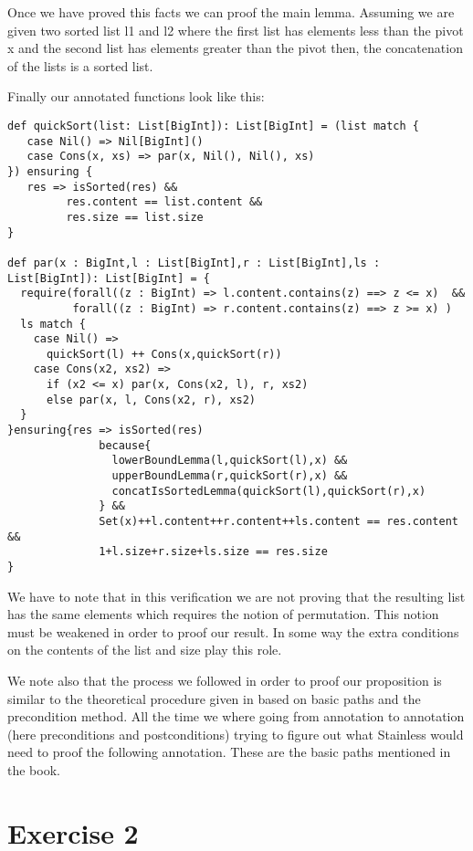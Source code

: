 \documentclass[a4paper,11pt]{article}
\theoremstyle{mytheor}
\begin{document}
Once we have proved this facts we can proof the main lemma. Assuming we are given two sorted list l1 and l2 where the first list has elements less than the pivot x and the second list has elements greater than the pivot then, the concatenation of the lists is a sorted list. 

Finally our annotated functions look like this:

\begin{lstlisting}[label={list:first},caption=Annotated quickSort and par functions]
def quickSort(list: List[BigInt]): List[BigInt] = (list match {
   case Nil() => Nil[BigInt]()
   case Cons(x, xs) => par(x, Nil(), Nil(), xs)
}) ensuring { 
   res => isSorted(res) && 
         res.content == list.content && 
         res.size == list.size 
}
 
def par(x : BigInt,l : List[BigInt],r : List[BigInt],ls : List[BigInt]): List[BigInt] = {
  require(forall((z : BigInt) => l.content.contains(z) ==> z <= x)  && 
          forall((z : BigInt) => r.content.contains(z) ==> z >= x) )
  ls match {
    case Nil() => 
      quickSort(l) ++ Cons(x,quickSort(r))
    case Cons(x2, xs2) => 
      if (x2 <= x) par(x, Cons(x2, l), r, xs2) 
      else par(x, l, Cons(x2, r), xs2)
  }
}ensuring{res => isSorted(res) 
              because{
                lowerBoundLemma(l,quickSort(l),x) &&
                upperBoundLemma(r,quickSort(r),x) &&
                concatIsSortedLemma(quickSort(l),quickSort(r),x) 
              } &&
              Set(x)++l.content++r.content++ls.content == res.content &&
              1+l.size+r.size+ls.size == res.size
}
\end{lstlisting}  

We have to note that in this verification we are not proving that the resulting list has the same elements which requires the notion of permutation. This notion must be weakened in order to proof our result. In some way the extra conditions on the contents of the list and size play this role.

We note also that the process we followed in order to proof our proposition is similar to the theoretical procedure given in \cite{calculus-of-computation} based on basic paths and the precondition method. All the time we where going from annotation to annotation (here preconditions and postconditions) trying to figure out what Stainless would need to proof the following annotation. These are the basic paths mentioned in the book. 

\section*{Exercise 2}
\end{document}
